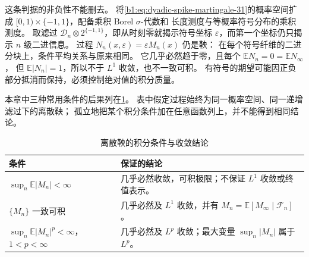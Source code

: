 这条判据的非负性不能删去。
将\eqref{b1:eq:dyadic-spike-martingale-31}的概率空间扩成
\([0,1)\times\{-1,1\}\)，配备乘积 Borel \(\sigma\)-代数和
长度测度与等概率符号分布的乘积测度。
取滤过 \(\mathcal D_n\otimes2^{\{-1,1\}}\)，即从时刻零就揭示符号坐标
\(\varepsilon\)，而第一个坐标仍只揭示 \(n\) 级二进信息。
过程 \(N_n(x,\varepsilon)=\varepsilon M_n(x)\) 仍是鞅：
在每个符号纤维的二进分块上，条件平均关系与原来相同。
它几乎必然趋于零，且每个 \(\mathbb E N_n=0=\mathbb E N_\infty\)，
但 \(\mathbb E|N_n|=1\)，所以不于 \(L^1\) 收敛，也不一致可积。
有符号的期望可能因正负部分抵消而保持，必须控制绝对值的积分质量。

\ProseParagraphBreak

本章中三种常用条件的后果列在\cref{b1:tab:martingale-convergence-31}。
表中假定过程始终为同一概率空间、同一递增滤过下的离散鞅；
孤立地把某个积分条件加在任意函数列上，并不能得到相同结论。

\begin{table}[htbp]
\centering
\caption{离散鞅的积分条件与收敛结论}
\label{b1:tab:martingale-convergence-31}
\begin{tabular}{p{}p{}}
\toprule
条件 & 保证的结论 \\
\midrule
\(\sup_n\mathbb E|M_n|<\infty\) & 几乎必然收敛，可积极限；不保证 \(L^1\) 收敛或终值表示。 \\
\(\{M_n\}\) 一致可积 & 几乎必然及 \(L^1\) 收敛，并有 \(M_n=\mathbb E[M_\infty\mid\mathcal F_n]\)。 \\
\(\sup_n\mathbb E|M_n|^p<\infty\)，\(1<p<\infty\) & 几乎必然及 \(L^p\) 收敛；最大变量 \(\sup_n|M_n|\) 属于 \(L^p\)。 \\
\bottomrule
\end{tabular}
\end{table}

